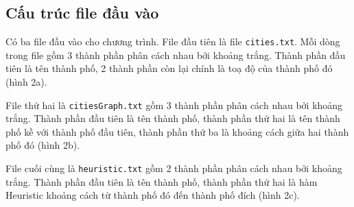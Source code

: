 \documentclass[a4paper, 11pt]{article}
\begin{document}
\subsection{Cấu trúc file đầu vào}
Có ba file đầu vào cho chương trình. File đầu tiên là file \lstinline|cities.txt|. Mỗi dòng trong file gồm 3 thành phần phân cách nhau bởi khoảng trắng. Thành phần đầu tiên là tên thành phố, 2 thành phần còn lại chính là toạ độ của thành phố đó (hình 2a).

File thứ hai là \lstinline|citiesGraph.txt| gồm 3 thành phần phân cách nhau bởi khoảng trắng. Thành phần đầu tiên là tên thành phố, thành phần thứ hai là tên thành phố kề với thành phố đầu tiên, thành phần thứ ba là khoảng cách giữa hai thành phố đó (hình 2b).

File cuối cùng là \lstinline|heuristic.txt| gồm 2 thành phần phân cách nhau bởi khoảng trắng. Thành phần đầu tiên là tên thành phố, thành phần thứ hai là hàm Heuristic khoảng cách từ thành phố đó đến thành phố đích (hình 2c).
\end{document}
